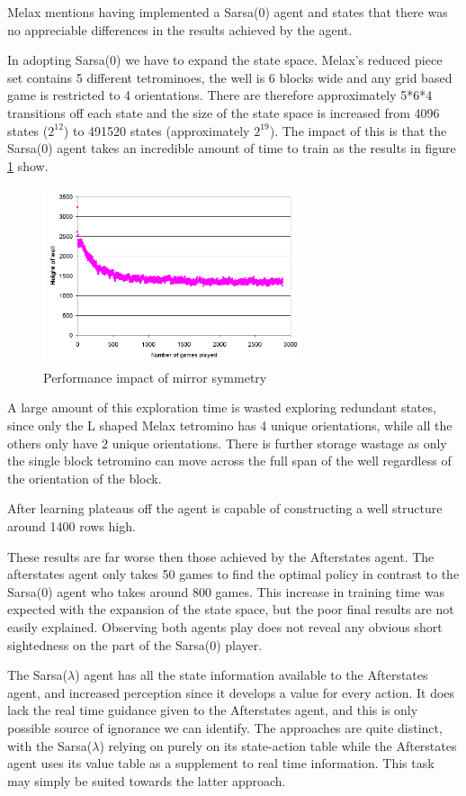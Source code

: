 \documentclass{rucsthesis}
\begin{document}
Melax mentions having implemented a Sarsa(0) agent and states that there was no appreciable differences in the results achieved by the agent. 

In adopting Sarsa(0) we have to expand the state space. Melax's reduced piece set contains 5 different tetrominoes, the well is 6 blocks wide and any grid based game is restricted to 4 orientations. There are therefore approximately 5*6*4 transitions off each state and the size of the state space is increased from 4096 states ($2^{12}$) to 491520 states (approximately $2^{19}$). The impact of this is that the Sarsa(0) agent takes an incredible amount of time to train as the results in figure \ref{fig:melaxsarsa} show.

\begin{figure}[h]
\centering
\includegraphics[width=3in]{sarsamelax.png}
\caption{Performance impact of mirror symmetry}
\label{fig:melaxsarsa}
\end{figure} 

A large amount of this exploration time is wasted exploring redundant states, since only the L shaped Melax tetromino has 4 unique orientations, while all the others only have 2 unique orientations. There is further storage wastage as only the single block tetromino can move across the full span of the well regardless of the orientation of the block. 

After learning plateaus off the agent is capable of constructing a well structure around 1400 rows high. 

These results are far worse then those achieved by the Afterstates agent. The afterstates agent only takes 50 games to find the optimal policy in contrast to the Sarsa(0) agent who takes around 800 games. This increase in training time was expected with the expansion of the state space, but the poor final results are not easily explained. Observing both agents play does not reveal any obvious short sightedness on the part of the Sarsa(0) player.

The Sarsa($\lambda$) agent has all the state information available to the Afterstates agent, and increased perception since it develops a value for every action. It does lack the real time guidance given to the Afterstates agent, and this is only possible source of ignorance we can identify. The approaches are quite distinct, with the Sarsa($\lambda$) relying on purely on its state-action table while the Afterstates agent uses its value table as a supplement to real time information. This task may simply be suited towards the latter approach.
\end{document}
